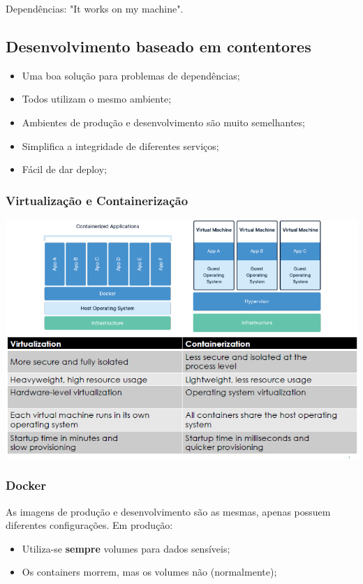 \documentclass{article}
\begin{document}
Dependências: "It works on my machine".

\subsection{Desenvolvimento baseado em contentores}

\begin{itemize}
  \item Uma boa solução para problemas de dependências;
  \item Todos utilizam o mesmo ambiente;
  \item Ambientes de produção e desenvolvimento são muito semelhantes;
  \item Simplifica a integridade de diferentes serviços;
  \item Fácil de dar deploy;
\end{itemize}

\pagebreak

\subsubsection{Virtualização e Containerização}

\begin{center}
  \includegraphics[scale=0.6]{56}
\end{center}

\subsubsection{Docker}

As imagens de produção e desenvolvimento são as mesmas, apenas possuem diferentes
configurações. Em produção:
\begin{itemize}
  \item Utiliza-se \textbf{sempre} volumes para dados sensíveis;
  \item Os containers morrem, mas os volumes não (normalmente);
\end{itemize}
\end{document}
